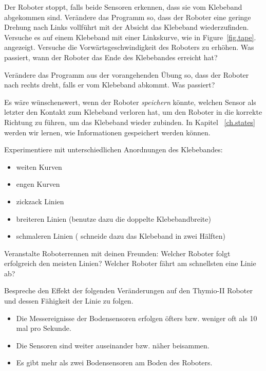 
Der Roboter stoppt,
falls beide Sensoren erkennen,
dass sie vom Klebeband abgekommen sind.
Verändere das Programm so,
dass der Roboter eine geringe Drehung nach Links vollführt mit der Absicht das Klebeband wiederzufinden.
Versuche es auf einem Klebeband mit einer Linkskurve,
wie in Figure~\ref{fig.tape}.  angezeigt.
Versuche die Vorwärtsgeschwindigkeit des Roboters zu erhöhen.
Was passiert, wann der Roboter das Ende des Klebebandes erreicht hat?


Verändere das Programm aus der vorangehenden Übung so,
dass der Roboter nach rechts dreht,
falls er vom Klebeband abkommt.
Was passiert?

Es wäre wünschenswert,
wenn der Roboter  \emph{speichern} könnte,
welchen Sensor als letzter den Kontakt zum Klebeband verloren hat,
um den Roboter in die korrekte Richtung zu führen,
um das Klebeband wieder zubinden.
In Kapitel ~\ref{ch.states} werden wir lernen,
wie Informationen gespeichert werden können.


Experimentiere mit unterschiedlichen Anordnungen des Klebebandes:

\begin{itemize}
\item weiten Kurven
\item engen Kurven
\item zickzack Linien
\item breiteren Linien (benutze dazu die doppelte Klebebandbreite)
\item schmaleren Linien ( schneide dazu das Klebeband in zwei Hälften)
\end{itemize}

Veranstalte Roboterrennen mit deinen Freunden:
Welcher Roboter folgt erfolgreich den meisten Linien?
Welcher Roboter fährt am schnellsten eine Linie ab?


Bespreche den Effekt der folgenden Veränderungen  auf den Thymio-II Roboter und dessen Fähigkeit der Linie zu folgen.

\begin{itemize}
\item Die Messereignisse der Bodensensoren erfolgen öfters bzw. weniger oft als 10 mal pro Sekunde.
\item Die Sensoren sind weiter auseinander bzw. näher beisammen.
\item Es gibt mehr als zwei Bodensensoren am Boden des Roboters.
\end{itemize}
